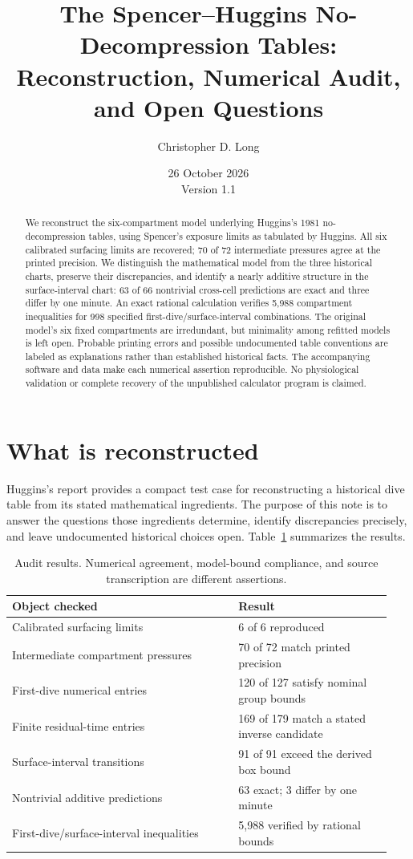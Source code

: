 \documentclass[11pt,letterpaper]{article}
\title{The Spencer--Huggins No-Decompression Tables:\\
Reconstruction, Numerical Audit, and Open Questions}
\author{Christopher D. Long}
\date{26 October 2026\\\small Version 1.1}
\begin{document}
\maketitle

\begin{abstract}
We reconstruct the six-compartment model underlying Huggins's 1981 no-decompression tables, using Spencer's exposure limits as tabulated by Huggins. All six calibrated surfacing limits are recovered; 70 of 72 intermediate pressures agree at the printed precision. We distinguish the mathematical model from the three historical charts, preserve their discrepancies, and identify a nearly additive structure in the surface-interval chart: 63 of 66 nontrivial cross-cell predictions are exact and three differ by one minute. An exact rational calculation verifies 5,988 compartment inequalities for 998 specified first-dive/surface-interval combinations. The original model's six fixed compartments are irredundant, but minimality among refitted models is left open. Probable printing errors and possible undocumented table conventions are labeled as explanations rather than established historical facts. The accompanying software and data make each numerical assertion reproducible. No physiological validation or complete recovery of the unpublished calculator program is claimed.
\end{abstract}

\section{What is reconstructed}
Huggins's report \cite{Huggins1981} provides a compact test case for reconstructing a historical dive table from its stated mathematical ingredients. The purpose of this note is to answer the questions those ingredients determine, identify discrepancies precisely, and leave undocumented historical choices open. Table~\ref{tab:summary} summarizes the results.

\begin{table}[ht]\centering\small
\caption{Audit results. Numerical agreement, model-bound compliance, and source transcription are different assertions.}\label{tab:summary}
\begin{tabular}{@{}p{0.56\linewidth}p{0.38\linewidth}@{}}\toprule
Object checked&Result\\\midrule
Calibrated surfacing limits&6 of 6 reproduced\\
Intermediate compartment pressures&70 of 72 match printed precision\\
First-dive numerical entries&120 of 127 satisfy nominal group bounds\\
Finite residual-time entries&169 of 179 match a stated inverse candidate\\
Surface-interval transitions&91 of 91 exceed the derived box bound\\
Nontrivial additive predictions&63 exact; 3 differ by one minute\\
First-dive/surface-interval inequalities&5,988 verified by rational bounds\\\bottomrule
\end{tabular}
\end{table}
\end{document}
